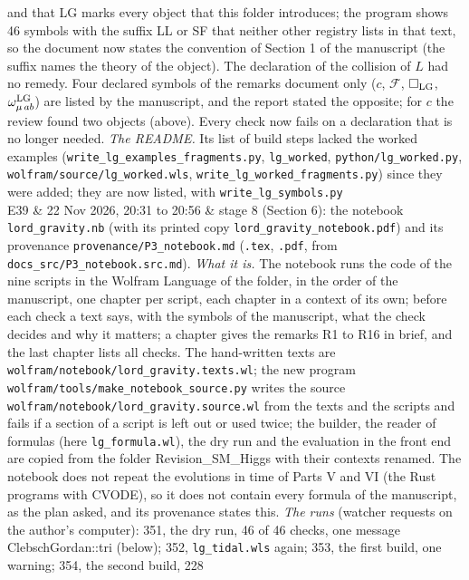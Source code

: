 \documentclass[
  10pt,
]{article}
\begin{document}
\begin{longtable}[]
and that LG marks every object that this folder introduces; the program
shows 46 symbols with the suffix LL or SF that neither other registry
lists in that text, so the document now states the convention of Section
1 of the manuscript (the suffix names the theory of the object). The
declaration of the collision of \(L\) had no remedy. Four declared
symbols of the remarks document only (\(c\), \(\mathcal F\),
\(\Box_{\rm LG}\), \(\omega^{\rm LG}_{\mu\,ab}\)) are listed by the
manuscript, and the report stated the opposite; for \(c\) the review
found two objects (above). Every check now fails on a declaration that
is no longer needed. \emph{The README.} Its list of build steps lacked
the worked examples (\texttt{write\_lg\_examples\_fragments.py},
\texttt{lg\_worked}, \texttt{python/lg\_worked.py},
\texttt{wolfram/source/lg\_worked.wls},
\texttt{write\_lg\_worked\_fragments.py}) since they were added; they
are now listed, with \texttt{write\_lg\_symbols.py} \\
E39 & 22 Nov 2026, 20:31 to 20:56 & stage 8 (Section 6): the notebook
\texttt{lord\_gravity.nb} (with its printed copy
\texttt{lord\_gravity\_notebook.pdf}) and its provenance
\texttt{provenance/P3\_notebook.md} (\texttt{.tex}, \texttt{.pdf}, from
\texttt{docs\_src/P3\_notebook.src.md}). \emph{What it is.} The notebook
runs the code of the nine scripts in the Wolfram Language of the folder,
in the order of the manuscript, one chapter per script, each chapter in
a context of its own; before each check a text says, with the symbols of
the manuscript, what the check decides and why it matters; a chapter
gives the remarks R1 to R16 in brief, and the last chapter lists all
checks. The hand-written texts are
\texttt{wolfram/notebook/lord\_gravity.texts.wl}; the new program
\texttt{wolfram/tools/make\_notebook\_source.py} writes the source
\texttt{wolfram/notebook/lord\_gravity.source.wl} from the texts and the
scripts and fails if a section of a script is left out or used twice;
the builder, the reader of formulas (here \texttt{lg\_formula.wl}), the
dry run and the evaluation in the front end are copied from the folder
Revision\_SM\_Higgs with their contexts renamed. The notebook does not
repeat the evolutions in time of Parts V and VI (the Rust programs with
CVODE), so it does not contain every formula of the manuscript, as the
plan asked, and its provenance states this. \emph{The runs} (watcher
requests on the author's computer): 351, the dry run, 46 of 46 checks,
one message ClebschGordan::tri (below); 352, \texttt{lg\_tidal.wls}
again; 353, the first build, one warning; 354, the second build, 228

\end{longtable}
\end{document}
